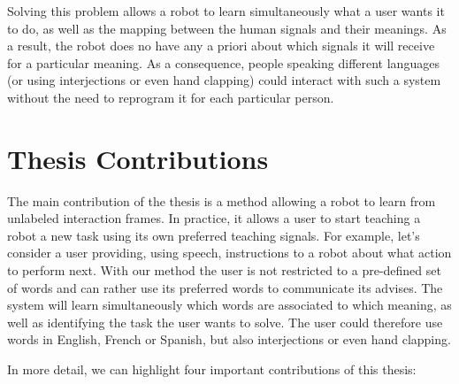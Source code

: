 Solving this problem allows a robot to learn simultaneously what a user wants it to do, as well as the mapping between the human signals and their meanings. As a result, the robot does no have any a priori about which signals it will receive for a particular meaning. As a consequence, people speaking different languages (or using interjections or even hand clapping) could interact with such a system without the need to reprogram it for each particular person.

\section{Thesis Contributions}

The main contribution of the thesis is a method allowing a robot to learn from unlabeled interaction frames. In practice, it allows a user to start teaching a robot a new task using its own preferred teaching signals. For example, let's consider a user providing, using speech, instructions to a robot about what action to perform next. With our method the user is not restricted to a pre-defined set of words and can rather use its preferred words to communicate its advises. The system will learn simultaneously which words are associated to which meaning, as well as identifying the task the user wants to solve. The user could therefore use words in English, French or Spanish, but also interjections or even hand clapping.

In more detail, we can highlight four important contributions of this thesis:

